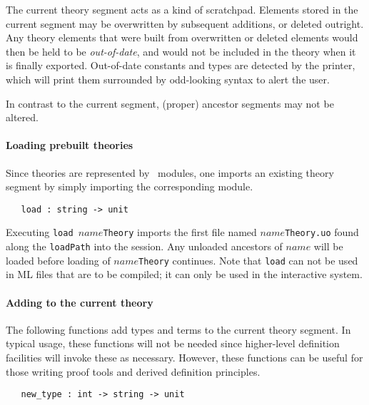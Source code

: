 The current theory segment acts as a kind of scratchpad. Elements stored
in the current segment may be overwritten by subsequent additions, or
deleted outright. Any theory elements that were built from overwritten
or deleted elements would then be held to be {\it out-of-date}, and would not
be included in the theory when it is finally exported.  Out-of-date
constants and types are detected by the \HOL{} printer, which will print
them surrounded by odd-looking syntax to alert the user.

In contrast to the current segment, (proper) ancestor segments may not
be altered.
%


\paragraph{Loading prebuilt theories}

Since \HOL{} theories are represented by \ML\ modules, one imports an
existing theory segment by simply importing the corresponding module.

\begin{holboxed}
\begin{verbatim}
   load : string -> unit
\end{verbatim}\end{holboxed}

\noindent
Executing {\small\verb+load +}$name${\small\verb+Theory+} imports the
first file named $name${\small\verb+Theory.uo+} found along the
{\small\verb+loadPath+} into the session. Any unloaded ancestors of
$name$ will be loaded before loading of $name${\small\verb+Theory+}
continues.  Note that {\small\verb+load+} can not be used in ML files
that are to be compiled; it can only be used in the interactive
system.

\paragraph{Adding to the current theory}

The following \ML{} functions add types and terms to the current
theory segment. In typical usage, these functions will not be
needed since higher-level definition facilities will invoke these as
necessary. However, these functions can be useful for those writing
proof tools and derived definition principles.

\begin{holboxed}
\begin{verbatim}
   new_type : int -> string -> unit
\end{verbatim}
\end{holboxed}


